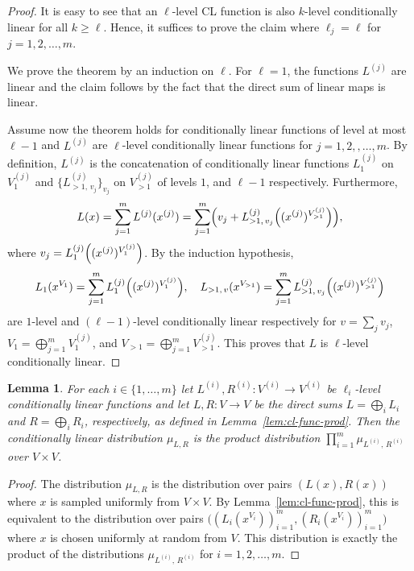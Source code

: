 \documentclass[11pt]{article}
\newtheorem{lemma}[theorem]{Lemma}
\theoremstyle{definition}
\begin{document}
\begin{proof}
  It is easy to see that an $\ell$-level CL function is also $k$-level
  conditionally linear for all $k \ge \ell$.
  Hence, it suffices to prove the claim where $\ell_j = \ell$ for $j=1, 2,
  \ldots, m$.

  We prove the theorem by an induction on $\ell$.
  For $\ell = 1$, the functions $L^{(j)}$ are linear and the claim follows by
  the fact that the direct sum of linear maps is linear.

  Assume now the theorem holds for conditionally linear functions of level at
  most $\ell-1$ and $L^{(j)}$ are $\ell$-level conditionally linear functions
  for $j=1, 2, ,\ldots, m$.
  By definition, $L^{(j)}$ is the concatenation of conditionally linear
  functions $L^{(j)}_{1}$ on $V^{(j)}_1$ and $\{ L^{(j)}_{>1,\, v_j} \}_{v_j}$
  on $V^{(j)}_{>1}$ of levels $1$, and $\ell-1$ respectively.
  Furthermore,
  \begin{equation*}
    L(x) = \sum_{j=1}^m L^{(j)} (x^{(j)}) = \sum_{j=1}^m \Bigl( v_j +
    L^{(j)}_{>1,\, v_j}
    \Bigl((x^{(j)})^{V^{(j)}_{>1}} \Bigr) \Bigr),
  \end{equation*}
  where $v_j = L^{(j)}_{1}\Bigl( (x^{(j)})^{V^{(j)}_1}
    \Bigr)$.
  By the induction hypothesis,
  \begin{equation*}
    L_{1} (x^{V_1}) = \sum_{j=1}^m L^{(j)}_{1}\Bigl( (x^{(j)})^{V^{(j)}_1}
    \Bigr),\quad L_{>1,\, v} (x^{V_{>1}}) = \sum_{j=1}^m L^{(j)}_{>1,\, v_j}
    \Bigl((x^{(j)})^{V^{(j)}_{>1}} \Bigr)
  \end{equation*}
  are $1$-level and $(\ell-1)$-level conditionally linear respectively for $v =
  \sum_j v_j$, $V_1 = \bigoplus_{j=1}^m V^{(j)}_1$, and $V_{>1} =
  \bigoplus_{j=1}^m V^{(j)}_{>1}$.
  This proves that $L$ is $\ell$-level conditionally linear.
\end{proof}

\begin{lemma}
  \label{lem:cl-dist-prod}
  For each $i \in \{1,\ldots,m\}$ let $L^{(i)}, R^{(i)} : V^{(i)} \to V^{(i)}$
  be $\ell_i$-level conditionally linear functions and let $L, R: V \to V$ be the
  direct sums $L = \bigoplus_i L_i$ and $R = \bigoplus_i R_i$, respectively, as
  defined in Lemma~\ref{lem:cl-func-prod}.
  Then the conditionally linear distribution $\mu_{L, R}$ is the product
  distribution $\prod_{i=1}^m \mu_{L^{(i)},\, R^{(i)}}$ over $V \times V$.
\end{lemma}

\begin{proof}
	The distribution $\mu_{L,R}$ is the distribution over pairs $(L(x),R(x))$
  where $x$ is sampled uniformly from $V \times V$.
  By Lemma~\ref{lem:cl-func-prod}, this is equivalent to the distribution over
  pairs $\bigl( (L_i(x^{V_i}))_{i=1}^m,  (R_i(x^{V_i}))_{i=1}^m \bigr)$ where $x$
  is chosen uniformly at random from $V$.
  This distribution is exactly the product of the distributions $
  \mu_{L^{(i)},\, R^{(i)}}$ for $i = 1, 2, \ldots, m$.
\end{proof}
\end{document}
